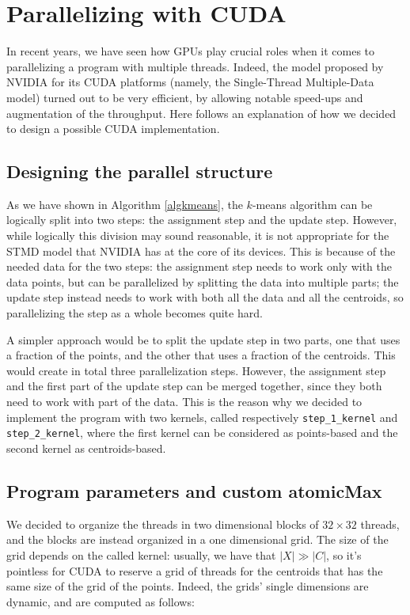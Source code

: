 \documentclass[11pt, journal]{IEEEtran}
\newcommand{\nwl}{

\vspace{11pt}

}
\begin{document}
\section{Parallelizing with CUDA}

In recent years, we have seen how GPUs play crucial roles when it comes to parallelizing a program with multiple threads. Indeed, the model proposed by NVIDIA for its CUDA platforms (namely, the Single-Thread Multiple-Data model) turned out to be very efficient, by allowing notable speed-ups and augmentation of the throughput. Here follows an explanation of how we decided to design a possible CUDA implementation.

\subsection{Designing the parallel structure}

As we have shown in Algorithm \ref{algkmeans}, the $k$-means algorithm can be logically split into two steps: the assignment step and the update step. However, while logically this division may sound reasonable, it is not appropriate for the STMD model that NVIDIA has at the core of its devices. This is because of the needed data for the two steps: the assignment step needs to work only with the data points, but can be parallelized by splitting the data into multiple parts; the update step instead needs to work with both all the data and all the centroids, so parallelizing the step as a whole becomes quite hard.
\nwl
A simpler approach would be to split the update step in two parts, one that uses a fraction of the points, and the other that uses a fraction of the centroids. This would create in total three parallelization steps. However, the assignment step and the first part of the update step can be merged together, since they both need to work with part of the data. This is the reason why we decided to implement the program with two kernels, called respectively \verb|step_1_kernel| and \verb|step_2_kernel|, where the first kernel can be considered as points-based and the second kernel as centroids-based.

\subsection{Program parameters and custom atomicMax}

We decided to organize the threads in two dimensional blocks of $32 \times 32$ threads, and the blocks are instead organized in a one dimensional grid. The size of the grid depends on the called kernel: usually, we have that $|X| \gg |C|$, so it's pointless for CUDA to reserve a grid of threads for the centroids that has the same size of the grid of the points. Indeed, the grids' single dimensions are dynamic, and are computed as follows:
\end{document}
